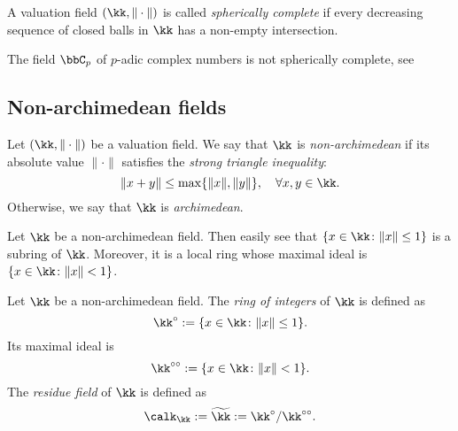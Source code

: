     \begin{definition}\label{def:spherically_complete}
        A valuation field \((\kk,\|\cdot\|)\) is called \emph{spherically complete} if every decreasing sequence of closed balls in \(\kk\) has a non-empty intersection.
    \end{definition}

    \begin{example}\label{eg:p-adic_complex_field_is_not_spherically_complete}
        The field \(\bbC_p\) of \(p\)-adic complex numbers is not spherically complete, see 
    \end{example}

\subsection{Non-archimedean fields}

    \begin{definition}\label{def:non-archimedean_fields}
        Let \((\kk,\|\cdot\|)\) be a valuation field.
        We say that \(\kk\) is \emph{non-archimedean} if its absolute value \(\|\cdot\|\) satisfies the \emph{strong triangle inequality}:
        \[ \|x+y\|\leq\max\{\|x\|,\|y\|\},\quad\forall x,y\in\kk. \]
        Otherwise, we say that \(\kk\) is \emph{archimedean}.
    \end{definition}

    Let \(\kk\) be a non-archimedean field.
    Then easily see that \(\{x \in \kk\colon \|x\|\leq 1\}\) is a subring of \(\kk\).
    Moreover, it is a local ring whose maximal ideal is \(\{x \in \kk\colon \|x\| < 1\}\).

    \begin{definition}\label{def:non-archimedean_field_ring_of_integers_maximal_ideal_and_residue_field}
        Let \(\kk\) be a non-archimedean field.
        The \emph{ring of integers} of \(\kk\) is defined as
        \[ \kk^\circ := \{x \in \kk\colon \|x\|\leq 1\}. \]
        Its maximal ideal is
        \[ \kk^{\circ\circ} := \{x \in \kk\colon \|x\| < 1\}. \]
        The \emph{residue field} of \(\kk\) is defined as
        \[ \calk_\kk := \widetilde{\kk} := \kk^\circ / \kk^{\circ\circ}. \]
    \end{definition}



